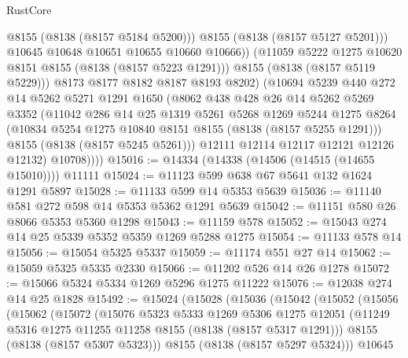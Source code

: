 \begin{lexlean}{RustCore}
\begin{coremodule}
                      @8155
                      (@8138 (@8157 @5184 @5200)))
                    @8155
                    (@8138 (@8157 @5127 @5201)))
                  @10645
                  @10648
                  @10651
                  @10655
                  @10660
                  @10666))
              (@11059 @5222 @1275 @10620 @8151 @8155 (@8138 (@8157 @5223 @1291)))
              @8155
              (@8138 (@8157 @5119 @5229)))
            @8173
            @8177
            @8182
            @8187
            @8193
            @8202)
          (@10694
            @5239
            @440
            @272
            @14
            @5262
            @5271
            @1291
            @1650
            (@8062
              @438
              @428
              @26
              @14
              @5262
              @5269
              @3352
              (@11042
                @286
                @14
                @25
                @1319
                @5261
                @5268
                @1269
                @5244
                @1275
                @8264
                (@10834 @5254 @1275 @10840 @8151 @8155 (@8138 (@8157 @5255 @1291)))
                @8155
                (@8138 (@8157 @5245 @5261)))
              @12111
              @12114
              @12117
              @12121
              @12126
              @12132)
            @10708))))
@15016 := @14334 (@14338 (@14506 (@14515 (@14655 @15010)))) @11111
@15024 := @11123 @599 @638 @67 @5641 @132 @1624 @1291 @5897
@15028 := @11133 @599 @14 @5353 @5639
@15036 := @11140 @581 @272 @598 @14 @5353 @5362 @1291 @5639
@15042 := @11151 @580 @26 @8066 @5353 @5360 @1298
@15043 := @11159 @578
@15052 := @15043 @274 @14 @25 @5339 @5352 @5359 @1269 @5288 @1275
@15054 := @11133 @578 @14
@15056 := @15054 @5325 @5337
@15059 := @11174 @551 @27 @14
@15062 := @15059 @5325 @5335 @2330
@15066 := @11202 @526 @14 @26 @1278
@15072 := @15066 @5324 @5334 @1269 @5296 @1275 @11222
@15076 := @12038 @274 @14 @25 @1828
@15492 := @15024
    (@15028
      (@15036
        (@15042
          (@15052
            (@15056
              (@15062
                (@15072
                  (@15076
                    @5323
                    @5333
                    @1269
                    @5306
                    @1275
                    @12051
                    (@11249 @5316 @1275 @11255 @11258 @8155 (@8138 (@8157 @5317 @1291)))
                    @8155
                    (@8138 (@8157 @5307 @5323)))
                  @8155
                  (@8138 (@8157 @5297 @5324)))
                @10645

\end{coremodule}
\end{lexlean}
